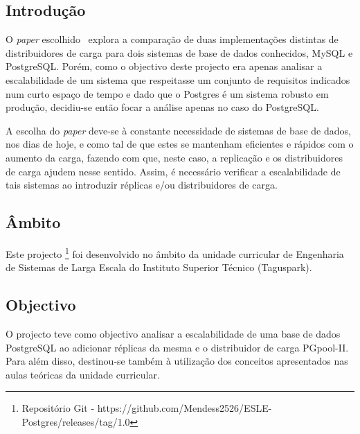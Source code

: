 \subsection{Introdução}
O \textit{paper} escolhido~\cite{paper} explora a comparação de duas implementações distintas de distribuidores de carga para dois sistemas de base de dados conhecidos, MySQL e PostgreSQL. Porém, como o objectivo deste projecto era apenas analisar a escalabilidade de um sistema que respeitasse um conjunto de requisitos indicados num curto espaço de tempo e dado que o Postgres é um sistema robusto em produção, decidiu-se então focar a análise apenas no caso do PostgreSQL. 

A escolha do \textit{paper} deve-se à constante necessidade de sistemas de base de dados, nos dias de hoje, e como tal de que estes se mantenham eficientes e rápidos com o aumento da carga, fazendo com que, neste caso, a replicação e os distribuidores de carga ajudem nesse sentido. Assim, é necessário verificar a escalabilidade de tais sistemas ao introduzir réplicas e/ou distribuidores de carga.

\subsection{Âmbito}

Este projecto \footnote{Repositório Git - https://github.com/Mendess2526/ESLE-Postgres/releases/tag/1.0} foi desenvolvido no âmbito da unidade curricular de Engenharia de Sistemas de Larga Escala do Instituto Superior Técnico (Taguspark).

\subsection{Objectivo}

O projecto teve como objectivo analisar a escalabilidade de uma base de dados PostgreSQL ao adicionar réplicas da mesma e o distribuidor de carga PGpool-II. Para além disso, destinou-se também à utilização dos conceitos apresentados nas aulas teóricas da unidade curricular.